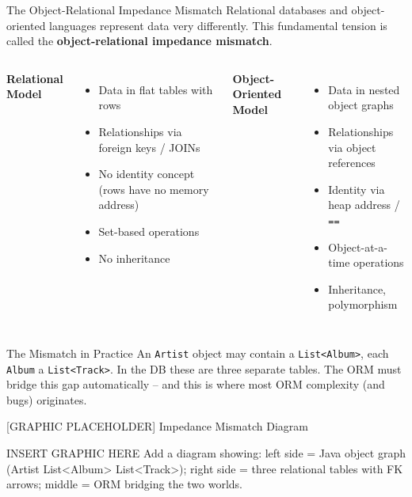 \begin{frame}[fragile]{The Object-Relational Impedance Mismatch}
  Relational databases and object-oriented languages represent data very differently.
  This fundamental tension is called the \textbf{object-relational impedance mismatch}.

  \begin{columns}[T]
      \textbf{Relational Model}
      \begin{itemize}
        \item Data in flat tables with rows
        \item Relationships via foreign keys / JOINs
        \item No identity concept (rows have no memory address)
        \item Set-based operations
        \item No inheritance
      \end{itemize}

      \textbf{Object-Oriented Model}
      \begin{itemize}
        \item Data in nested object graphs
        \item Relationships via object references
        \item Identity via heap address / \texttt{==}
        \item Object-at-a-time operations
        \item Inheritance, polymorphism
      \end{itemize}
  \end{columns}

  \vspace{6pt}
  \begin{alertblock}{The Mismatch in Practice}
    An \texttt{Artist} object may contain a \texttt{List<Album>}, each \texttt{Album} a
    \texttt{List<Track>}. In the DB these are three separate tables. The ORM must bridge this
    gap automatically -- and this is where most ORM complexity (and bugs) originates.
  \end{alertblock}
\end{frame}

\begin{frame}{[GRAPHIC PLACEHOLDER] Impedance Mismatch Diagram}
  \begin{alertblock}{INSERT GRAPHIC HERE}
    Add a diagram showing: left side = Java object graph (Artist \textrightarrow{} List<Album>
    \textrightarrow{} List<Track>); right side = three relational tables with FK arrows;
    middle = ORM bridging the two worlds.
  \end{alertblock}
\end{frame}

